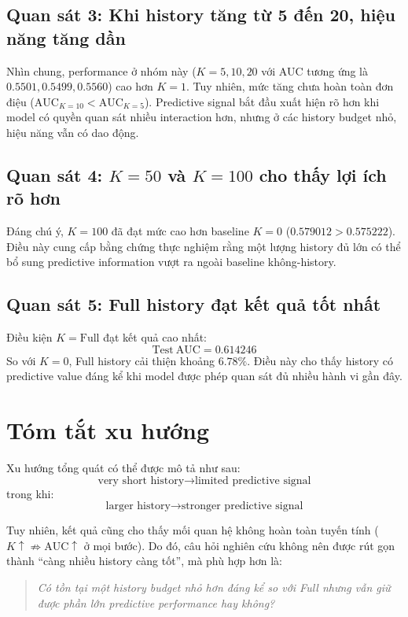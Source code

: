 \documentclass[12pt,a4paper]{article}
\begin{document}
\subsection{Quan sát 3: Khi history tăng từ 5 đến 20, hiệu năng tăng dần}
Nhìn chung, performance ở nhóm này ($K=5, 10, 20$ với AUC tương ứng là $0.5501, 0.5499, 0.5560$) cao hơn $K=1$. Tuy nhiên, mức tăng chưa hoàn toàn đơn điệu ($\mathrm{AUC}_{K=10} < \mathrm{AUC}_{K=5}$). Predictive signal bắt đầu xuất hiện rõ hơn khi model có quyền quan sát nhiều interaction hơn, nhưng ở các history budget nhỏ, hiệu năng vẫn có dao động.

\subsection{Quan sát 4: $K=50$ và $K=100$ cho thấy lợi ích rõ hơn}
Đáng chú ý, $K=100$ đã đạt mức cao hơn baseline $K=0$ ($0.579012 > 0.575222$). Điều này cung cấp bằng chứng thực nghiệm rằng một lượng history đủ lớn có thể bổ sung predictive information vượt ra ngoài baseline không-history.

\subsection{Quan sát 5: Full history đạt kết quả tốt nhất}
Điều kiện $K=\mathrm{Full}$ đạt kết quả cao nhất:
\[
\boxed{ \mathrm{Test\ AUC} = 0.614246 }
\]
So với $K=0$, Full history cải thiện khoảng $6.78\%$. Điều này cho thấy history có predictive value đáng kể khi model được phép quan sát đủ nhiều hành vi gần đây.

\section{Tóm tắt xu hướng}

Xu hướng tổng quát có thể được mô tả như sau:
\[
\text{very short history} \rightarrow \text{limited predictive signal}
\]
trong khi:
\[
\text{larger history} \rightarrow \text{stronger predictive signal}
\]

Tuy nhiên, kết quả cũng cho thấy mối quan hệ không hoàn toàn tuyến tính ($K\uparrow \not\Rightarrow \mathrm{AUC}\uparrow$ ở mọi bước). Do đó, câu hỏi nghiên cứu không nên được rút gọn thành ``càng nhiều history càng tốt'', mà phù hợp hơn là:

\begin{quote}
\textit{
Có tồn tại một history budget nhỏ hơn đáng kể so với Full nhưng vẫn giữ được phần lớn predictive performance hay không?
}
\end{quote}
\end{document}
